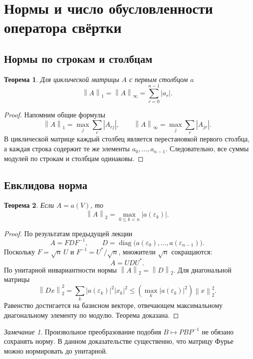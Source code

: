 \documentclass[12pt,a4paper]{article}
\newtheorem{theorem}{Теорема}
\theoremstyle{definition}
\theoremstyle{remark}
\newtheorem*{remark}{Замечание}
\DeclareMathOperator{\diag}{diag}
\newcommand{\eps}{\varepsilon}
\newcommand{\norm}[1]{\left\lVert #1\right\rVert}
\begin{document}
\section{Нормы и число обусловленности оператора свёртки}

\subsection{Нормы по строкам и столбцам}

\begin{theorem}
Для циклической матрицы $A$ с первым столбцом $a$
\[
  \boxed{\norm{A}_1=\norm{A}_\infty=\sum_{r=0}^{n-1}|a_r|}.
\]
\end{theorem}

\begin{proof}
Напомним общие формулы
\[
  \norm{A}_1=\max_j\sum_r|A_{rj}|,\qquad
  \norm{A}_\infty=\max_j\sum_r|A_{jr}|.
\]
В циклической матрице каждый столбец является перестановкой первого
столбца, а каждая строка содержит те же элементы $a_0,\dots,a_{n-1}$.
Следовательно, все суммы модулей по строкам и столбцам одинаковы.
\end{proof}

\subsection{Евклидова норма}

\begin{theorem}
Если $A=a(V)$, то
\[
  \boxed{\norm{A}_2=\max_{0\leqslant k<n}|a(\eps_k)|}.
\]
\end{theorem}

\begin{proof}
По результатам предыдущей лекции
\[
  A=FDF^{-1},\qquad
  D=\diag\bigl(a(\eps_0),\dots,a(\eps_{n-1})\bigr).
\]
Поскольку $F=\sqrt n\,U$ и $F^{-1}=U^*/\sqrt n$, множители
$\sqrt n$ сокращаются:
\[
  A=UDU^*.
\]
По унитарной инвариантности нормы $\norm{A}_2=\norm{D}_2$.
Для диагональной матрицы
\[
  \norm{Dx}_2^2=\sum_k|a(\eps_k)|^2|x_k|^2
  \leqslant\left(\max_k|a(\eps_k)|^2\right)\norm{x}_2^2.
\]
Равенство достигается на базисном векторе, отвечающем максимальному
диагональному элементу по модулю. Теорема доказана.
\end{proof}

\begin{remark}
Произвольное преобразование подобия $B\mapsto PBP^{-1}$ не обязано
сохранять норму. В данном доказательстве существенно, что матрицу Фурье
можно нормировать до унитарной.
\end{remark}
\end{document}
